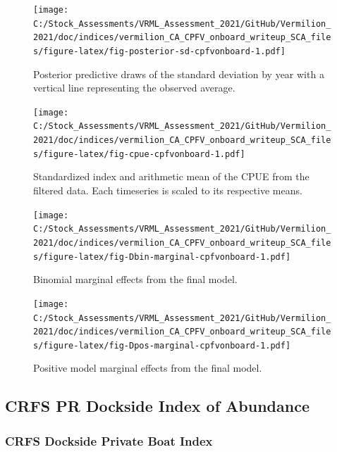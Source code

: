 \documentclass[11pt,
  english,
  a4paper,
]{article}
\begin{document}
\begin{figure}
\centering
\texttt{[image: C:/Stock\_Assessments/VRML\_Assessment\_2021/GitHub/Vermilion\_2021/doc/indices/vermilion\_CA\_CPFV\_onboard\_writeup\_SCA\_files/figure-latex/fig-posterior-sd-cpfvonboard-1.pdf]}
\caption{\label{fig:fig-posterior-sd-cpfvonboard}Posterior predictive draws of the standard deviation by year with a vertical line representing the observed average.}
\end{figure}

\begin{figure}
\centering
\texttt{[image: C:/Stock\_Assessments/VRML\_Assessment\_2021/GitHub/Vermilion\_2021/doc/indices/vermilion\_CA\_CPFV\_onboard\_writeup\_SCA\_files/figure-latex/fig-cpue-cpfvonboard-1.pdf]}
\caption{\label{fig:fig-cpue-cpfvonboard}Standardized index and arithmetic mean of the CPUE from the filtered data. Each timeseries is scaled to its respective means.}
\end{figure}

\begin{figure}
\centering
\texttt{[image: C:/Stock\_Assessments/VRML\_Assessment\_2021/GitHub/Vermilion\_2021/doc/indices/vermilion\_CA\_CPFV\_onboard\_writeup\_SCA\_files/figure-latex/fig-Dbin-marginal-cpfvonboard-1.pdf]}
\caption{\label{fig:fig-Dbin-marginal-cpfvonboard}Binomial marginal effects from the final model.}
\end{figure}

\begin{figure}
\centering
\texttt{[image: C:/Stock\_Assessments/VRML\_Assessment\_2021/GitHub/Vermilion\_2021/doc/indices/vermilion\_CA\_CPFV\_onboard\_writeup\_SCA\_files/figure-latex/fig-Dpos-marginal-cpfvonboard-1.pdf]}
\caption{\label{fig:fig-Dpos-marginal-cpfvonboard}Positive model marginal effects from the final model.}
\end{figure}

\clearpage


\hypertarget{pr-index}{%
\subsection{CRFS PR Dockside Index of Abundance}\label{pr-index}}

\leavevmode\tagmcend\tagstructend


\hypertarget{crfs-dockside-private-boat-index}{%
\subsubsection{CRFS Dockside Private Boat Index}\label{crfs-dockside-private-boat-index}}
\end{document}
